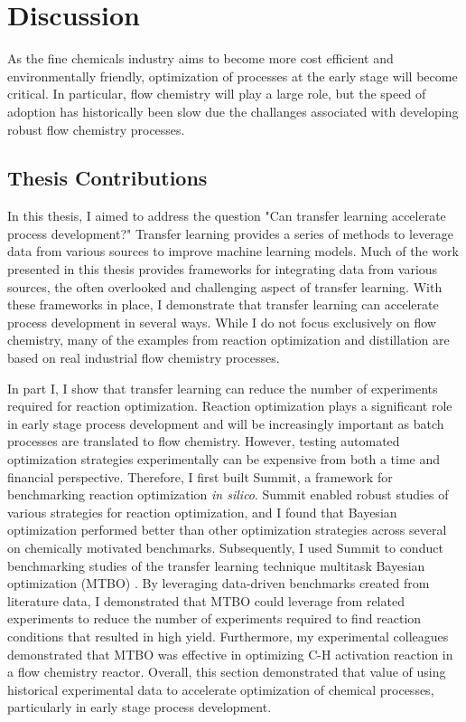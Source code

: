 \chapter{Discussion}\label{ch:discussion} 

As the fine chemicals industry aims to become more cost efficient and environmentally friendly, optimization of processes at the early stage will become critical. In particular, flow chemistry will play a large role, but the speed of adoption has historically been slow due the challanges associated with developing robust flow chemistry processes.

\section{Thesis Contributions}

In this thesis, I aimed to address the question "Can transfer learning accelerate process development?"  Transfer learning provides a series of methods to leverage data from various sources to improve machine learning models. Much of the work presented in this thesis provides frameworks for integrating data from various sources, the often overlooked and challenging aspect of transfer learning. With these frameworks in place, I demonstrate that transfer learning can accelerate process development in several ways. While I do not focus exclusively on flow chemistry, many of the examples from reaction optimization and distillation are based on real industrial flow chemistry processes.

In part I, I show that transfer learning can reduce the number of experiments required for reaction optimization. Reaction optimization plays a significant role in early stage process development and will be increasingly important as batch processes are translated to flow chemistry. However, testing automated optimization strategies experimentally can be expensive from both a time and financial perspective.  Therefore, I first built Summit, a framework for benchmarking reaction optimization \textit{in silico}. Summit enabled robust studies of various strategies for reaction optimization, and I found that Bayesian optimization performed better than other optimization strategies across several on chemically motivated benchmarks. Subsequently, I used Summit to conduct benchmarking studies of the transfer learning technique multitask Bayesian optimization (MTBO) \cite{Swersky2013}. By leveraging data-driven benchmarks created from literature data, I demonstrated that MTBO could leverage from related experiments to reduce the number of experiments required to find reaction conditions that resulted in high yield. Furthermore, my experimental colleagues demonstrated that MTBO was effective in optimizing C-H activation reaction in a flow chemistry reactor.  Overall, this section demonstrated that value of using historical experimental data to accelerate optimization of chemical processes, particularly in early stage process development. 

